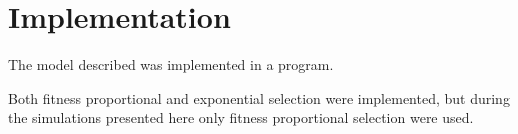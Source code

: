 \section{Implementation} \label{sec:implem}
The model described was implemented in a \matlab program.\mypar

\mypar


Both fitness proportional and exponential selection were implemented, but during the simulations presented here only fitness proportional selection were used. 

